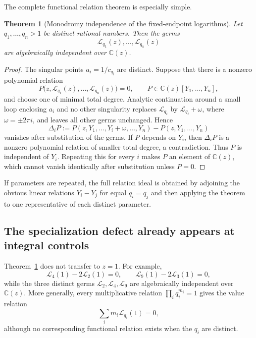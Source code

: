 \documentclass[11pt,oneside]{article}
\newtheorem{theorem}{Theorem}[section]
\theoremstyle{definition}
\theoremstyle{remark}
\newcommand{\C}{\mathbb C}
\newcommand{\cL}{\mathcal L}
\begin{document}
The complete functional relation theorem is especially simple.

\begin{theorem}[Monodromy independence of the fixed-endpoint logarithms]
\label{thm:monodromy-independence}
Let $q_1,\ldots,q_n>1$ be distinct rational numbers.  Then the germs
\[
  \cL_{q_1}(z),\ldots,\cL_{q_n}(z)
\]
are algebraically independent over $\C(z)$.
\end{theorem}

\begin{proof}
The singular points $a_i=1/c_{q_i}$ are distinct.  Suppose that there is a nonzero polynomial
relation
\[
  P\bigl(z,\cL_{q_1}(z),\ldots,\cL_{q_n}(z)\bigr)=0,
  \qquad P\in\C(z)[Y_1,\ldots,Y_n],
\]
and choose one of minimal total degree.  Analytic continuation around a small loop enclosing
$a_i$ and no other singularity replaces $\cL_{q_i}$ by $\cL_{q_i}+\omega$, where
$\omega=\pm2\pi i$, and leaves all other germs unchanged.  Hence
\[
  \Delta_iP:=P(z,Y_1,\ldots,Y_i+\omega,\ldots,Y_n)-P(z,Y_1,\ldots,Y_n)
\]
vanishes after substitution of the germs.  If $P$ depends on $Y_i$, then $\Delta_iP$ is a
nonzero polynomial relation of smaller total degree, a contradiction.  Thus $P$ is independent
of $Y_i$.  Repeating this for every $i$ makes $P$ an element of $\C(z)$, which cannot vanish
identically after substitution unless $P=0$.
\end{proof}

If parameters are repeated, the full relation ideal is obtained by adjoining the obvious linear
relations $Y_i-Y_j$ for equal $q_i=q_j$ and then applying the theorem to one representative of
each distinct parameter.

\subsection{The specialization defect already appears at integral controls}

Theorem~\ref{thm:monodromy-independence} does not transfer to $z=1$.  For example,
\begin{equation}
  \cL_4(1)-2\cL_2(1)=0,
  \qquad
  \cL_9(1)-2\cL_3(1)=0,
  \label{eq:differential-integral-collapse}
\end{equation}
while the three distinct germs $\cL_2,\cL_4,\cL_9$ are algebraically independent over
$\C(z)$.  More generally, every multiplicative relation
$\prod_iq_i^{m_i}=1$ gives the value relation
\begin{equation}
  \sum_i m_i\cL_{q_i}(1)=0,
  \label{eq:value-multiplicative-relation}
\end{equation}
although no corresponding functional relation exists when the $q_i$ are distinct.
\end{document}
